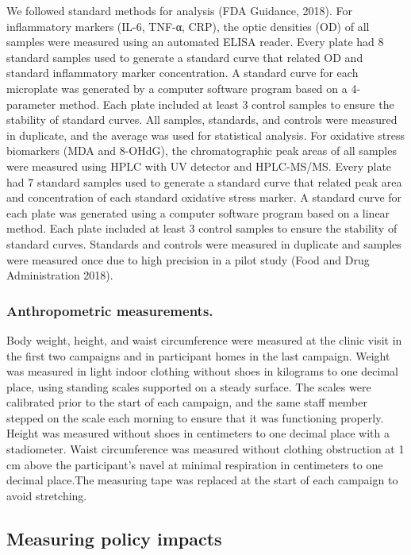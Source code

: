 \documentclass[
  letterpaper,
  DIV=11,
  numbers=noendperiod]{scrartcl}
\begin{document}
We followed standard methods for analysis (FDA Guidance, 2018). For
inflammatory markers (IL-6, TNF-α, CRP), the optic densities (OD) of all
samples were measured using an automated ELISA reader. Every plate had 8
standard samples used to generate a standard curve that related OD and
standard inflammatory marker concentration. A standard curve for each
microplate was generated by a computer software program based on a
4-parameter method. Each plate included at least 3 control samples to
ensure the stability of standard curves. All samples, standards, and
controls were measured in duplicate, and the average was used for
statistical analysis. For oxidative stress biomarkers (MDA and 8-OHdG),
the chromatographic peak areas of all samples were measured using HPLC
with UV detector and HPLC-MS/MS. Every plate had 7 standard samples used
to generate a standard curve that related peak area and concentration of
each standard oxidative stress marker. A standard curve for each plate
was generated using a computer software program based on a linear
method. Each plate included at least 3 control samples to ensure the
stability of standard curves. Standards and controls were measured in
duplicate and samples were measured once due to high precision in a
pilot study (Food and Drug Administration 2018).

\hypertarget{anthropometric-measurements.}{%
\subsubsection{Anthropometric
measurements.}\label{anthropometric-measurements.}}

Body weight, height, and waist circumference were measured at the clinic
visit in the first two campaigns and in participant homes in the last
campaign. Weight was measured in light indoor clothing without shoes in
kilograms to one decimal place, using standing scales supported on a
steady surface. The scales were calibrated prior to the start of each
campaign, and the same staff member stepped on the scale each morning to
ensure that it was functioning properly. Height was measured without
shoes in centimeters to one decimal place with a stadiometer. Waist
circumference was measured without clothing obstruction at 1 cm above
the participant's navel at minimal respiration in centimeters to one
decimal place.The measuring tape was replaced at the start of each
campaign to avoid stretching.

\hypertarget{measuring-policy-impacts}{%
\subsection{Measuring policy impacts}\label{measuring-policy-impacts}}
\end{document}
